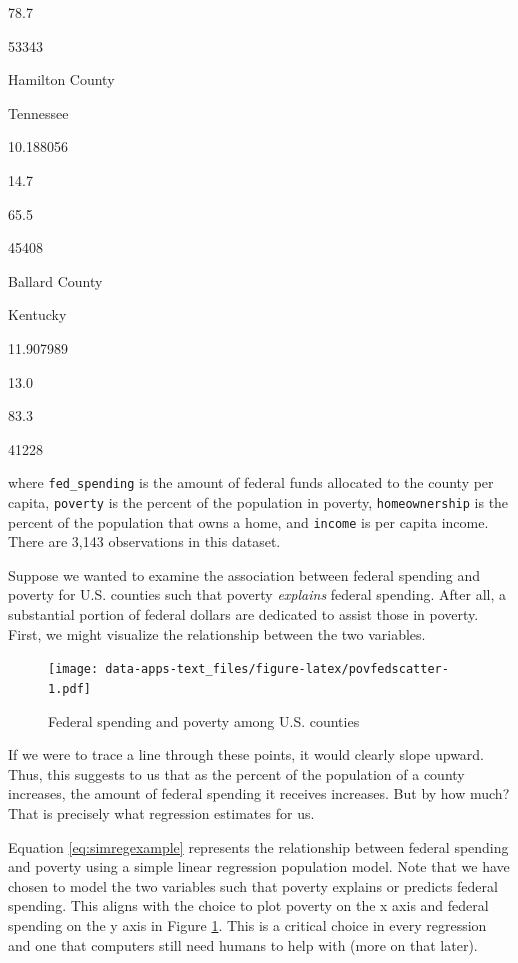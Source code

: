 \documentclass[
]{book}
\begin{document}
78.7

53343

Hamilton County

Tennessee

10.188056

14.7

65.5

45408

Ballard County

Kentucky

11.907989

13.0

83.3

41228

where \texttt{fed\_spending} is the amount of federal funds allocated to the county per capita, \texttt{poverty} is the percent of the population in poverty, \texttt{homeownership} is the percent of the population that owns a home, and \texttt{income} is per capita income. There are 3,143 observations in this dataset.

Suppose we wanted to examine the association between federal spending and poverty for U.S. counties such that poverty \emph{explains} federal spending. After all, a substantial portion of federal dollars are dedicated to assist those in poverty. First, we might visualize the relationship between the two variables.

\begin{figure}
\centering
\texttt{[image: data-apps-text\_files/figure-latex/povfedscatter-1.pdf]}
\caption{\label{fig:povfedscatter}Federal spending and poverty among U.S. counties}
\end{figure}

If we were to trace a line through these points, it would clearly slope upward. Thus, this suggests to us that as the percent of the population of a county increases, the amount of federal spending it receives increases. But by how much? That is precisely what regression estimates for us.

Equation \eqref{eq:simregexample} represents the relationship between federal spending and poverty using a simple linear regression population model. Note that we have chosen to model the two variables such that poverty explains or predicts federal spending. This aligns with the choice to plot poverty on the x axis and federal spending on the y axis in Figure \ref{fig:povfedscatter}. This is a critical choice in every regression and one that computers still need humans to help with (more on that later).
\end{document}

